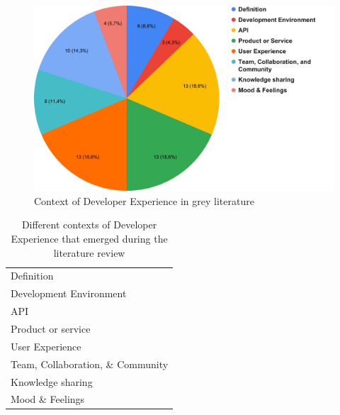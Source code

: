 \documentclass[english, 12pt, a4paper, sci, utf8, a-1b, online]{aaltothesis}
\begin{document}
\begin{figure}[h]
  \begin{center}
    \includegraphics[width=\textwidth]{context-grey.pdf}
    \captionsetup{width=0.6\textwidth}
    \caption{Context of Developer Experience in grey literature}
  \end{center}
\end{figure}

\begin{table}[ht]
  \begin{center}
    \begin{tabular}{l}
      \hline
      Definition                        \\
      Development Environment           \\
      API                               \\
      Product or service                \\
      User Experience                   \\
      Team, Collaboration, \& Community \\
      Knowledge sharing                 \\
      Mood \& Feelings                  \\
      \hline
    \end{tabular}
    \captionsetup{width=0.6\textwidth}
    \caption{Different contexts of Developer Experience that emerged during the literature review}
    \label{table:contexts}
  \end{center}
\end{table}
\end{document}
